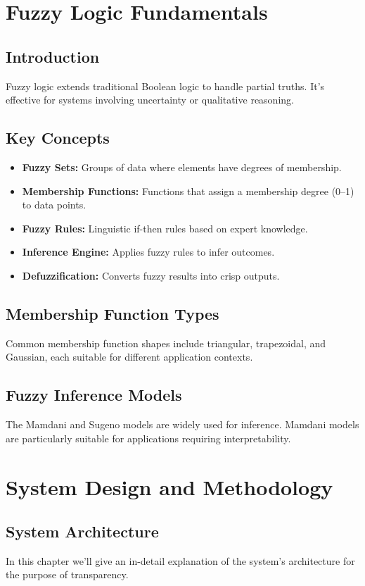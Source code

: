 \documentclass[a4paper]{article}
\begin{document}
\section{Fuzzy Logic Fundamentals}
\subsection{Introduction}
Fuzzy logic extends traditional Boolean logic to handle partial truths. It’s effective for systems involving uncertainty or qualitative reasoning.

\subsection{Key Concepts}
\begin{itemize}
\item \textbf{Fuzzy Sets:} Groups of data where elements have degrees of membership.
\item \textbf{Membership Functions:} Functions that assign a membership degree (0–1) to data points.
\item \textbf{Fuzzy Rules:} Linguistic if-then rules based on expert knowledge.
\item \textbf{Inference Engine:} Applies fuzzy rules to infer outcomes.
\item \textbf{Defuzzification:} Converts fuzzy results into crisp outputs.
\end{itemize}

\subsection{Membership Function Types}
Common membership function shapes include triangular, trapezoidal, and Gaussian, each suitable for different application contexts.

\subsection{Fuzzy Inference Models}
The Mamdani and Sugeno models are widely used for inference. Mamdani models are particularly suitable for applications requiring interpretability.

\section{System Design and Methodology}
\subsection{System Architecture}
In this chapter we'll give an in-detail explanation of the system's architecture for the purpose of transparency.
\end{document}
